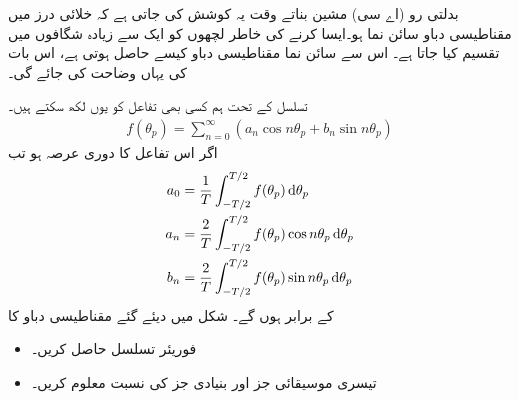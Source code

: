 بدلتی رو (اے سی) مشین بناتے وقت یہ کوشش کی جاتی ہے کہ خلائی درز میں مقناطیسی دباو سائن نما ہو۔ایسا کرنے کی خاطر لچھوں کو ایک سے زیادہ شگافوں میں تقسیم کیا جاتا ہے۔ اس سے سائن نما مقناطیسی دباو کیسے حاصل ہوتی ہے، اس بات کی  یہاں وضاحت کی جائے گی۔

 تسلسل کے تحت ہم کسی بھی تفاعل   کو یوں لکھ سکتے ہیں۔
\begin{align}
f(\theta_p)=\sum_{n=0}^{\infty} (a_n \cos n \theta_p +b_n \sin n \theta_p)
\end{align}
اگر اس تفاعل کا دوری عرصہ  ہو تب
\begin{gather}
\begin{aligned}\label{مساوات_گھومتے_مشین_فورئر_تسلسل_جزو}
a_0&=\frac{1}{T} \int_{-T/2}^{T/2} f(\theta_p) \dif \theta_p\\
a_n&=\frac{2}{T} \int_{-T/2}^{T/2} f(\theta_p) \cos n \theta_p \dif \theta_p\\
b_n&=\frac{2}{T} \int_{-T/2}^{T/2} f(\theta_p) \sin n \theta_p \dif \theta_p
\end{aligned}
\end{gather}
کے برابر ہوں گے۔
%
شکل   میں دیئے گئے مقناطیسی دباو کا
\begin{itemize}
\item
فوریئر تسلسل حاصل کریں۔
\item
تیسری موسیقائی جز اور بنیادی جز کی نسبت معلوم کریں۔
\end{itemize}

